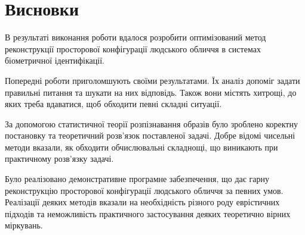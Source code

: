\chapter*{Висновки}

В результаті виконання роботи вдалося
розробити оптимізований метод реконструкції просторової конфігурації
людського обличчя в системах біометричної ідентифікації.

Попередні роботи приголомшують своїми результатами.
Їх аналіз допоміг задати правильні питання та шукати на них відповідь.
Також вони містять хитрощі, до яких треба вдаватися,
щоб обходити певні складні ситуації.

За допомогою статистичної теорії розпізнавання образів
було зроблено коректну постановку та теоретичний розв'язок поставленої задачі.
Добре відомі чисельні методи вказали,
як обходити обчислювальні складнощі,
що виникають при практичному розв'язку задачі.

Було реалізовано демонстративне програмне забезпечення,
що дає гарну реконструкцію просторової конфігурації
людського обличчя за певних умов.
Реалізації деяких методів вказали на необхідність
різного роду еврістичних підходів
та неможливість практичного застосування деяких теоретично вірних міркувань.
